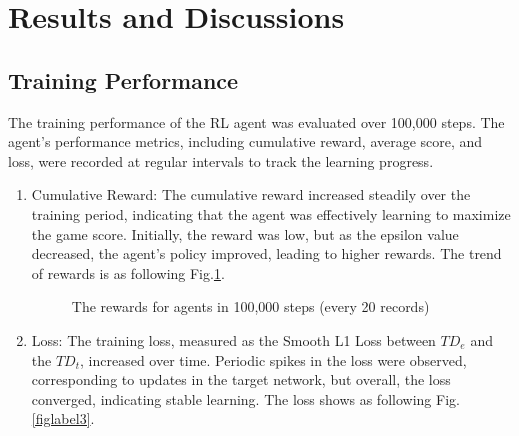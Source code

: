 \documentclass[preprint,12pt,3p,times]{elsarticle}
\begin{document}
\section{Results and Discussions}

\subsection{Training Performance}
The training performance of the RL agent was evaluated over 100,000 steps. The agent's performance metrics, including cumulative reward, average score, and loss, were recorded at regular intervals to track the learning progress.

\begin{enumerate}
\item [1.]Cumulative Reward: The cumulative reward increased steadily over the training period, indicating that the agent was effectively learning to maximize the game score. Initially, the reward was low, but as the epsilon value decreased, the agent's policy improved, leading to higher rewards. The trend of rewards is as following Fig.\ref{figlabel2}.

\begin{figure}[!t]
\centering
{}
\caption{\label{figlabel2}The rewards for agents in 100,000 steps (every 20 records) }
\end{figure}

\item [2.]Loss: The training loss, measured as the Smooth L1 Loss between\cite{girshick2015fast}  \(TD_{e}\) and the \(TD_{t}\), increased over time. Periodic spikes in the loss were observed, corresponding to updates in the target network, but overall, the loss converged, indicating stable learning. The loss shows as following Fig.\ref{figlabel3}.


\end{enumerate}
\end{document}
